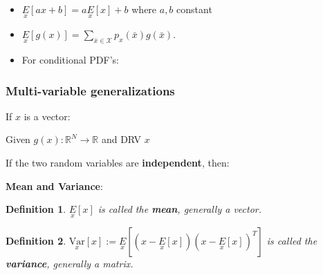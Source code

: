 \documentclass[10pt,a4paper]{scrartcl}
\newtheorem{define}{Definition}
\begin{document}
\begin{multicols*}{2}
\begin{multicols*}{3}
{\begin{itemize}
\item $\underset{x}{E}[ax+b]=a\underset{x}{E}[x]+b$ where $a,b$ constant
\item $\underset{x}{E}[g(x)]=\sum\limits_{\bar{x}\in\mathcal{X}}p_x(\bar{x})g(\bar{x})$.
\item For conditional PDF's:
\end{itemize}



\subsubsection{Multi-variable generalizations}

If $x$ is a vector:

\mportant{$\underset{x}{E}[x]=\sum\limits_{\bar{x}\in\mathcal{X}}\bar{x}p_x(\bar{x})=\sum\limits_{\bar{x_1}\in\mathcal{X}}\cdots\sum\limits_{\bar{x}_N\in\mathcal{X}}[\bar{x}_1,\ldots,\bar{x}_N]^Tp_{(x_1,\ldots,x_N)}(\bar{x}_1,\ldots,\bar{x}_N]$}

Given $g(x):\mathbb{R}^N\rightarrow \mathbb{R}$ and DRV $x$


If the two random variables are \textbf{independent}, then:


\textbf{Mean and Variance}:

\begin{define}
$\underset{x}{E}[x]$ is called the \textbf{mean}, generally a vector.
\end{define}

\begin{define}
$\underset{x}{\text{Var}}[x]:=\underset{x}{E}\left[\left(x-\underset{x}{E}[x]\right)\left(x-\underset{x}{E}[x]\right)^T\right]$ is called the \textbf{variance}, generally a matrix.
\end{define}

}
\end{multicols*}
\end{multicols*}
\end{document}
